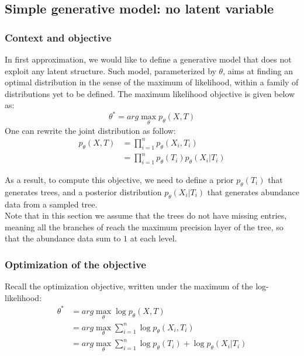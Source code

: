 \subsection{Simple generative model: no latent variable}

\subsubsection{Context and objective}

In first approximation, we would like to define a generative model that does not exploit any latent structure.
Such model, parameterized by $\theta$, aims at finding an optimal distribution in the sense of the maximum of likelihood,
within a family of distributions yet to be defined.
The maximum likelihood objective is given below as:
$$
\theta^* = arg\max_{\theta} p_{\theta}(X, T)
$$
One can rewrite the joint distribution as follow:
$$
\begin{align}
    p_{\theta}(X, T) &= \prod_{i=1}^n p_{\theta}(X_i, T_i) \\
                    &= \prod_{i=1}^n p_{\theta}(T_i) p_{\theta}(X_i | T_i)
\end{align}
$$

As a result, to compute this objective, we need to define a prior $p_{\theta}(T_i)$ that generates trees,
and a posterior distribution $p_{\theta}(X_i | T_i)$ that generates abundance data from a sampled tree. \\

Note that in this section we assume that the trees do not have missing entries, meaning all the branches of
reach the maximum precision layer of the tree, so that the abundance data sum to $1$ at each level. \\





\subsubsection{Optimization of the objective}

Recall the optimization objective, written under the maximum of the log-likelihood:
$$
\begin{align}
    \theta^* &= arg \max_{\theta} \log p_{\theta}(X,T) \\
            &= arg \max_{\theta} \sum_{i=1}^n \log p_{\theta}(X_i, T_i) \\
            &= arg \max_{\theta} \sum_{i=1}^n \log p_{\theta}(T_i) + \log p_{\theta}(X_i | T_i)
\end{align}
$$

